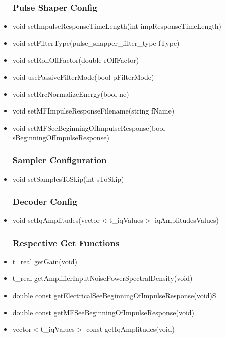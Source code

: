 \begin{itemize}
        \subsubsection{Pulse Shaper Config}
            \item void setImpulseResponseTimeLength(int impResponseTimeLength)
            \item void setFilterType(pulse\_shapper\_filter\_type fType)
            \item void setRollOffFactor(double rOffFactor)
            \item void usePassiveFilterMode(bool pFilterMode)
            \item void setRrcNormalizeEnergy(bool ne)
            \item void setMFImpulseResponseFilename(string fName)
            \item void setMFSeeBeginningOfImpulseResponse(bool sBeginningOfImpulseResponse)
        \subsubsection{Sampler Configuration}
            \item void setSamplesToSkip(int sToSkip)
        \subsubsection{Decoder Config}
            \item void setIqAmplitudes(vector$<$t\_iqValues$>$
            iqAmplitudesValues)
        \subsubsection{Respective Get Functions}
            \item t\_real getGain(void)
            \item t\_real getAmplifierInputNoisePowerSpectralDensity(void)
            \item double const getElectricalSeeBeginningOfImpulseResponse(void)S
            \item double const getMFSeeBeginningOfImpulseResponse(void)
            \item vector$<$t\_iqValues$>$ const getIqAmplitudes(void)
             \end{itemize}
\clearpage
